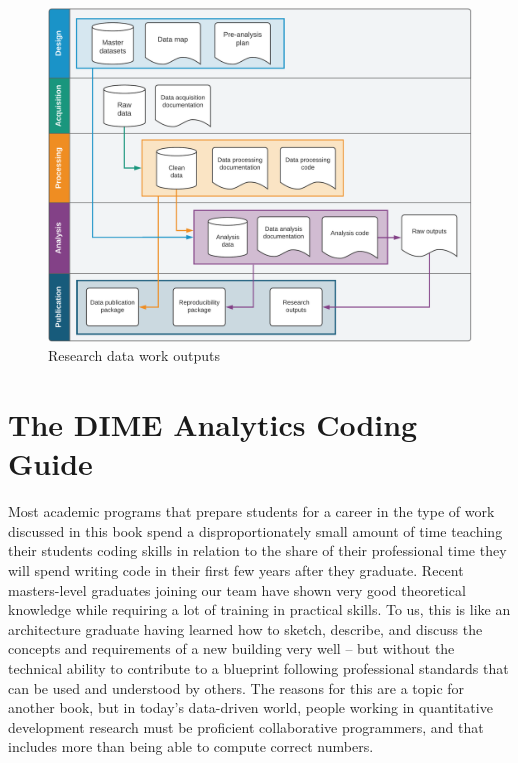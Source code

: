 \documentclass[
]{book}
\begin{document}
\begin{figure}
\includegraphics[width=31.93in]{diagrams/Conclusion} \caption{Research data work outputs}\label{fig:unnamed-chunk-49}
\end{figure}

\hypertarget{appendix-appendix}{%
\appendix}


\hypertarget{coding}{%
\chapter{The DIME Analytics Coding Guide}\label{coding}}

Most academic programs that prepare students for a career
in the type of work discussed in this book
spend a disproportionately small amount of time
teaching their students coding skills
in relation to the share of their professional time
they will spend writing code
in their first few years after they graduate.
Recent masters-level graduates joining our team
have shown very good theoretical knowledge
while requiring a lot of training in practical skills.
To us, this is like an architecture graduate having learned
how to sketch, describe, and discuss
the concepts and requirements of a new building very well --
but without the technical ability
to contribute to a blueprint following professional standards
that can be used and understood by others.
The reasons for this are a topic for another book,
but in today's data-driven world,
people working in quantitative development research
must be proficient collaborative programmers,
and that includes more than being able to compute correct numbers.
\end{document}
